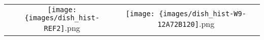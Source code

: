  \begin{tabular}{ccc}
\texttt{[image: \{images/dish\_hist-REF2]}.png} &\texttt{[image: \{images/dish\_hist-W9-12A72B120]}.png} & 
 \\ \end{tabular}